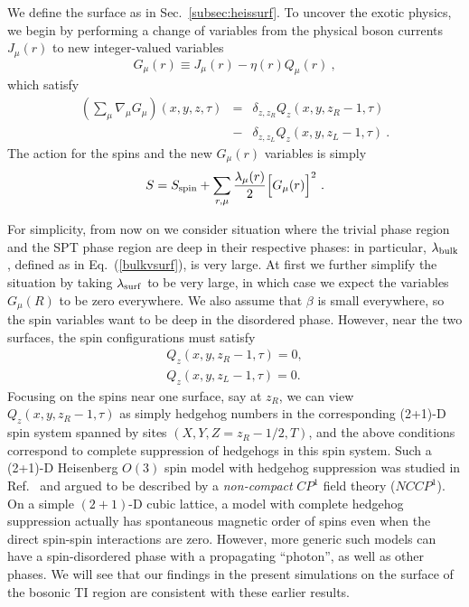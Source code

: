 \documentclass[prb,twocolumn]{revtex4-1}
\begin{document}
We define the surface as in Sec.~\ref{subsec:heissurf}. To uncover the exotic physics, we begin by performing a change of variables from the physical boson currents $J_\mu(r)$ to new integer-valued variables
\begin{equation}
G_\mu(r) \equiv J_\mu(r) - \eta(r) Q_\mu(r) ~,
\end{equation}
which satisfy 
\begin{eqnarray*}
\left(\sum_\mu \nabla_\mu G_\mu\right) (x, y, z, \tau) &=& 
\delta_{z, z_R} Q_z(x, y, z_R-1, \tau) \\
&-& \delta_{z, z_L} Q_z(x, y, z_L-1, \tau) ~. 
\end{eqnarray*}
The action for the spins and the new $G_\mu(r)$ variables is simply
\begin{equation}
S = S_{\rm spin} + \sum_{r,\mu} \frac{\lambda_\mu(r)}{2} \Big[G_\mu(r)\Big]^2 ~.
\end{equation}

For simplicity, from now on we consider situation where the trivial phase region and the SPT phase region are deep in their respective phases: in particular, $\lambda_{\rm bulk}$, defined as in Eq.~(\ref{bulkvsurf}), is very large.  At first we further simplify the situation by taking $\lambda_{\rm surf}$ to be very large, in which case we expect the variables $G_\mu(R)$ to be zero everywhere.  We also assume that $\beta$ is small everywhere, so the spin variables want to be deep in the disordered phase.  However, near the two surfaces, the spin configurations must satisfy
\begin{equation}
\begin{array}{c}
Q_z(x, y, z_R-1, \tau) = 0, \\
Q_z(x, y, z_L-1, \tau) = 0.
\end{array}
\end{equation}
Focusing on the spins near one surface, say at $z_R$, we can view $Q_z(x, y, z_R-1, \tau)$ as simply hedgehog numbers in the corresponding (2+1)-D spin system spanned by sites $(X, Y, Z=z_R-1/2, T)$, and the above conditions correspond to complete suppression of hedgehogs in this spin system.  Such a (2+1)-D Heisenberg $O(3)$ spin model with hedgehog suppression was studied in Ref.~ and argued to be described by a \emph{non-compact} $CP^1$ field theory ($NCCP^1$).  On a simple $(2+1)$-D cubic lattice, a model with complete hedgehog suppression actually has spontaneous magnetic order of spins even when the direct spin-spin interactions are zero.\cite{LauDasgupta, KamalMurthy}  However, more generic such models can have a spin-disordered phase with a propagating ``photon''\cite{KamalMurthy, LesikAshvin}, as well as other phases\cite{LesikAshvin2}.  We will see that our findings in the present simulations on the surface of the bosonic TI region are consistent with these earlier results.
\end{document}
